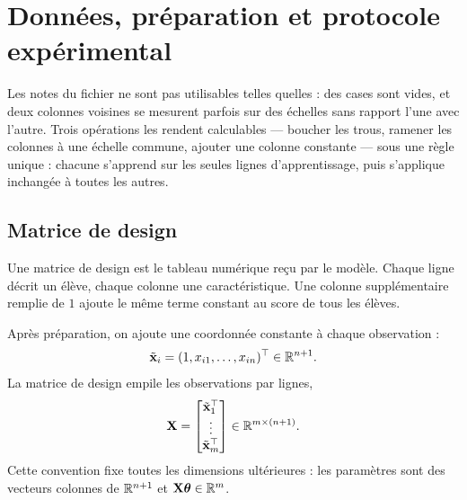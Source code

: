 \chapter{Données, préparation et protocole expérimental}
\label{ch:data}

\begin{lecture}
Les notes du fichier ne sont pas utilisables telles quelles : des cases sont
vides, et deux colonnes voisines se mesurent parfois sur des échelles sans
rapport l'une avec l'autre. Trois opérations les rendent calculables --- boucher
les trous, ramener les colonnes à une échelle commune, ajouter une colonne
constante --- sous une règle unique : chacune s'apprend sur les seules lignes
d'apprentissage, puis s'applique inchangée à toutes les autres.
\end{lecture}

\section{Matrice de design}

\begin{lecture}
Une matrice de design est le tableau numérique reçu par le modèle. Chaque ligne
décrit un élève, chaque colonne une caractéristique. Une colonne supplémentaire
remplie de $1$ ajoute le même terme constant au score de tous les élèves.
\end{lecture}

Après préparation, on ajoute une coordonnée constante à chaque observation :
\[
  \tilde{\mathbf{x}}_i=(1,x_{i1},\ldots,x_{in})^\top\in\mathbb{R}^{n+1}.
\]
La matrice de design empile les observations par lignes,
\[
  \mathbf{X}=\begin{bmatrix}\tilde{\mathbf{x}}_1^\top\\ \vdots\\\tilde{\mathbf{x}}_m^\top\end{bmatrix}
  \in\mathbb{R}^{m\times(n+1)}.
\]
Cette convention fixe toutes les dimensions ultérieures : les paramètres sont
des vecteurs colonnes de $\mathbb{R}^{n+1}$ et $\mathbf{X}\boldsymbol{\theta}\in\mathbb{R}^m$.

